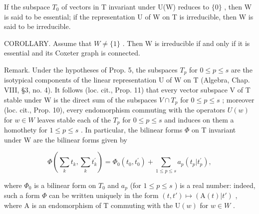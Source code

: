 If the subspace \(T_{0}\) of vectors in T invariant under U(W) reduces to \(\{0\}\) , then W is said to be essential; if the representation U of W on T is irreducible, then W is said to be irreducible.

COROLLARY. Assume that \(W \neq \{1\}\) . Then W is irreducible if and only if it is essential and its Coxeter graph is connected.

Remark. Under the hypotheses of Prop. 5, the subspaces \(T_{p}\) for \(0 \leqslant p \leqslant s\) are the isotypical components of the linear representation U of W on T (Algebra, Chap. VIII, §3, no. 4). It follows (loc. cit., Prop. 11) that every vector subspace V of T stable under W is the direct sum of the subspaces \(V \cap T_{p}\) for \(0 \leqslant p \leqslant s\) ; moreover (loc. cit., Prop. 10), every endomorphism commuting with the operators \(U(w)\) for \(w \in W\) leaves stable each of the \(T_{p}\) for \(0 \leqslant p \leqslant s\) and induces on them a homothety for \(1 \leqslant p \leqslant s\) . In particular, the bilinear forms \(\Phi\) on T invariant under W are the bilinear forms given by

\[
\varPhi \left(\sum_ {k} t _ {k}, \sum_ {k} t _ {k} ^ {\prime}\right) = \varPhi_ {0} (t _ {0}, t _ {0} ^ {\prime}) + \sum_ {1 \leqslant p \leqslant s} a _ {p} (t _ {p} | t _ {p} ^ {\prime}),
\]

where \(\Phi_{0}\) is a bilinear form on \(T_{0}\) and \(a_{p}\) (for \(1 \leqslant p \leqslant s\) ) is a real number: indeed, such a form \(\Phi\) can be written uniquely in the form \((t, t') \mapsto (\mathrm{A}(t)|t')\) , where A is an endomorphism of T commuting with the \(\mathrm{U}(w)\) for \(w \in W\) .
